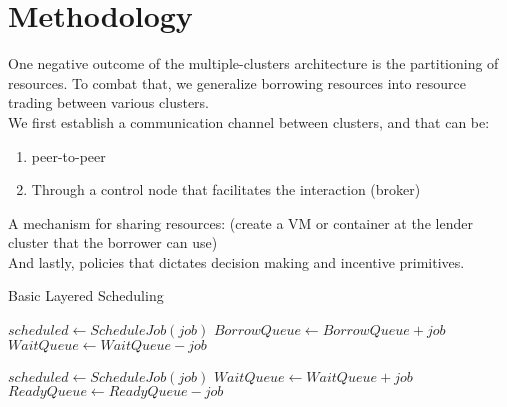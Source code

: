 \section{Methodology}
One negative outcome of the multiple-clusters architecture is the partitioning of resources. 
To combat that, we generalize borrowing resources into resource trading between various clusters. 
\\ We first establish a communication channel between clusters, and that can be:
\\ \begin{enumerate}
    \item peer-to-peer
    \item Through a control node that facilitates the interaction (broker)
\end{enumerate}
A mechanism for sharing resources: (create a VM or container at the lender cluster that the borrower can use)
\\ And lastly, policies that dictates decision making and incentive primitives. %

\begin{algorithm}
\caption{Basic Layered Scheduling}
\begin{algorithmic}
     
        \State $scheduled \gets ScheduleJob(job)$
        \State $BorrowQueue \gets BorrowQueue + job$
        \State $WaitQueue \gets WaitQueue - job$
        \EndIf
    \EndFor

     
        \State $scheduled \gets ScheduleJob(job)$
        \State $WaitQueue \gets WaitQueue + job$
        \State $ReadyQueue \gets ReadyQueue - job$
        \EndIf
    \EndFor
\end{algorithmic}
\end{algorithm}


